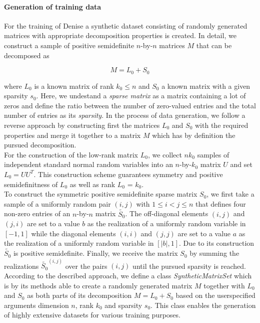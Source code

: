\paragraph{Generation of training data}
For the training of Denise a synthetic dataset consisting of randomly generated matrices with appropriate decomposition properties is created. In detail, we construct a sample of positive semidefinite $n$-by-$n$ matrices $M$ that can be decomposed as

\[
 M = L_0 + S_0
\]

where $L_0$ is a known matrix of rank $k_0 \leq n$ and $S_0$ a known matrix with a given sparsity $s_0$. Here, we undestand a \textit{sparse matrix} as a matrix containing a lot of zeros and define the ratio between the number of zero-valued entries and the total number of entries as its \textit{sparsity}. In the process of data generation, we follow a reverse approach by constructing first the matrices $L_0$ and $S_0$ with the required properties and merge it together to a matrix $M$ which has by definition the pursued decomposition.\\

For the construction of the low-rank matrix $L_0$, we collect $nk_0$ samples of independent standard normal random variables into an $n$-by-$k_0$ matrix $U$ and set $L_0 = UU^T$. This construction scheme guarantees symmetry and positive semidefinitness of $L_0$ as well as rank $L_0$ = $k_0$.\\

To construct the symmetric positive semidefinite sparse matrix $S_0$, we first take a sample of a uniformly random pair $(i,j)$ with $1 \leq i < j \leq n$ that defines four non-zero entries of an $n$-by-$n$ matrix $\tilde{S_0}$. The off-diagonal elements $(i,j)$ and $(j,i)$ are set to a value $b$ as the realization of a uniformly random variable in $[-1,1]$ while the diagonal elements $(i,i)$ and $(j,j)$ are set to a value $a$ as the realization of a uniformly random variable in $[\vert b \vert,1]$. Due to its construction $\tilde{S_0}$ is positive semidefinite. Finally, we receive the matrix $S_0$ by summing the realizations $\tilde{S_0}^{(i,j)}$ over the pairs $(i,j)$ until the pursued sparsity is reached.\\

According to the described approach, we define a class \textit{SyntheticMatrixSet} which is by its methods able to create a randomly generated matrix $M$ together with $L_0$ and $S_0$ as both parts of its decomposition  $M = L_0 + S_0$ based on the userspecified arguments dimension $n$, rank $k_0$ and sparsity $s_0$. This class enables the generation of highly extensive datasets for various training purposes.

